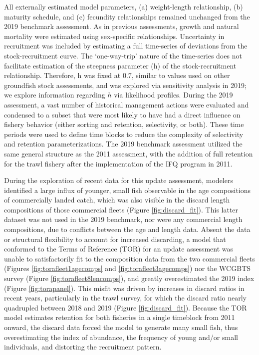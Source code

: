 \documentclass[11pt,
  english,
  a4paper,
]{article}
\begin{document}
All externally estimated model parameters, (a) weight-length relationship, (b) maturity schedule, and (c) fecundity relationships remained unchanged from the 2019 benchmark assessment. As in previous assessments, growth and natural mortality were estimated using sex-specific relationships. Uncertainty in recruitment was included by estimating a full time-series of deviations from the stock-recruitment curve. The `one-way-trip' nature of the time-series does not facilitate estimation of the steepness parameter (h) of the stock-recruitment relationship. Therefore, h was fixed at 0.7, similar to values used on other groundfish stock assessments, and was explored via sensitivity analysis in 2019; we explore information regarding {\(h\)\leavevmode\tagmcend\tagstructend} via likelihood profiles. During the 2019 assessment, a vast number of historical management actions were evaluated and condensed to a subset that were most likely to have had a direct influence on fishery behavior (either sorting and retention, selectivity, or both). These time periods were used to define time blocks to reduce the complexity of selectivity and retention parameterizations. The 2019 benchmark assessment utilized the same general structure as the 2011 assessment, with the addition of full retention for the trawl fishery after the implementation of the IFQ program in 2011.

\leavevmode\tagmcend\tagstructend\par


During the exploration of recent data for this update assessment, modelers identified a large influx of younger, small fish observable in the age compositions of commercially landed catch, which was also visible in the discard length compositions of those commercial fleets (Figure \ref{fig:discard_fit}). This latter dataset was not used in the 2019 benchmark, nor were any commercial length compositions, due to conflicts between the age and length data. Absent the data or structural flexibility to account for increased discarding, a model that conformed to the Terms of Reference (TOR) for an update assessment was unable to satisfactorily fit to the composition data from the two commercial fleets (Figures \ref{fig:torafleet1agecomps} and \ref{fig:torafleet3agecomps}) nor the WCGBTS survey (Figure \ref{fig:torafleet8lencomps}), and greatly overestimated the 2019 index (Figure \ref{fig:torapanel}). This misfit was driven by increases in discard ratios in recent years, particularly in the trawl survey, for which the discard ratio nearly quadrupled between 2018 and 2019 (Figure \ref{fig:discard_fit}). Because the TOR model estimates retention for both fisheries in a single timeblock from 2011 onward, the discard data forced the model to generate many small fish, thus overestimating the index of abundance, the frequency of young and/or small individuals, and distorting the recruitment pattern.
\end{document}
